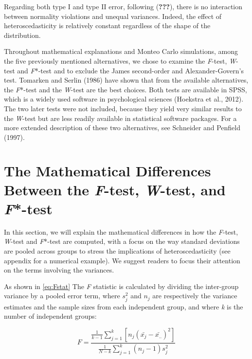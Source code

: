 \documentclass[man,floatsintext]{apa6}
\begin{document}
Regarding both type I and type II error, following ({\textbf{???}}),
there is no interaction between normality violations and unequal
variances. Indeed, the effect of heteroscedasticity is relatively
constant regardless of the shape of the distribution.

Throughout mathematical explanations and Monteo Carlo simulations, among
the five previously mentioned alternatives, we chose to examine the
\emph{F}-test, \emph{W}-test and \emph{F}*-test and to exclude the James
second-order and Alexander-Govern's test. Tomarken and Serlin (1986)
have shown that from the available alternatives, the \emph{F}*-test and
the \emph{W}-test are the best choices. Both tests are available in
SPSS, which is a widely used software in psychological sciences
(Hoekstra et al., 2012). The two later tests were not included, because
they yield very similar results to the \emph{W}-test but are less
readily available in statistical software packages. For a more extended
description of these two alternatives, see Schneider and Penfield
(1997).

\section{\texorpdfstring{The Mathematical Differences Between the
\emph{F}-test, \emph{W}-test, and
\emph{F}*-test}{The Mathematical Differences Between the F-test, W-test, and F*-test}}\label{the-mathematical-differences-between-the-f-test-w-test-and-f-test}

In this section, we will explain the mathematical differences in how the
\emph{F}-test, \emph{W}-test and \emph{F}*-test are computed, with a
focus on the way standard deviations are pooled across groups to stress
the implications of heteroscedasticity (see appendix for a numerical
example). We suggest readers to focus their attention on the terms
involving the variances.

As shown in \eqref{eq:Fstat} The \emph{F} statistic is calculated by
dividing the inter-group variance by a pooled error term, where
\(s_{j}^2\) and \(n_{j}\) are respectively the variance estimates and
the sample sizes from each independent group, and where \emph{k} is the
number of independent groups:

\begin{equation} 
F=\frac{\frac{1}{k-1}\sum_{j=1}^k [n_j(\bar{x_{j}}-\bar{x_{..}})^2]}{\frac{1}{N-k}\sum_{j=1}^k(n_j-1)s_j^2}
\label{eq:Fstat}
\end{equation}
\end{document}
